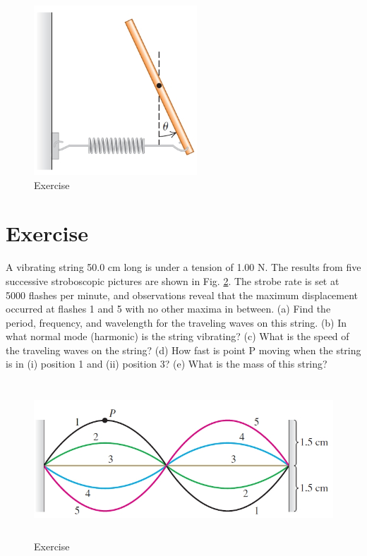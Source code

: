 \documentclass[12pt]{article}
\begin{document}

\begin{figure}[h!]
    \begin{center}
      \includegraphics[height=2.5in]{images/3.jpg}
      \caption{Exercise \theexample }
      \label{3}
    \end{center}
  \end{figure}



\section*{Exercise \theexample}

A vibrating string 50.0 cm long is under a tension of
1.00 N. The results from five successive stroboscopic pictures are
shown in Fig. \ref{4}. The strobe rate is set at 5000 flashes per
minute, and observations reveal that the maximum displacement
occurred at flashes 1 and 5 with no other maxima in between. (a)
Find the period, frequency, and wavelength for the traveling waves
on this string. (b) In what normal mode (harmonic) is the string
vibrating? (c) What is the speed of the traveling waves on the
string? (d) How fast is point P moving when the string is in (i)
position 1 and (ii) position 3? (e) What is the mass of this string?



\begin{figure}[h!]
    \begin{center}
      \includegraphics[height=2.3in]{images/4.jpg}
      \caption{Exercise \theexample }
      \label{4}
    \end{center}
  \end{figure}
\end{document}

